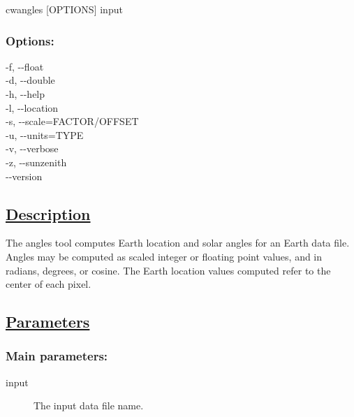  cwangles [OPTIONS] input
\subsubsection*{Options:}


  -f, -{-}float \\ 
 -d, -{-}double \\ 
 -h, -{-}help \\ 
 -l, -{-}location \\ 
 -s, -{-}scale=FACTOR/OFFSET \\ 
 -u, -{-}units=TYPE \\ 
 -v, -{-}verbose \\ 
 -z, -{-}sunzenith \\ 
 -{-}version \\ 

\subsection*{\underline{Description}}


 The angles tool computes Earth location and solar angles for an Earth data file. Angles may be computed as scaled integer or floating point values, and in radians, degrees, or cosine. The Earth location values computed refer to the center of each pixel.
\subsection*{\underline{Parameters}}
\subsubsection*{Main parameters:}
\begin{description}
\item[input]The input data file name.

\end{description}
